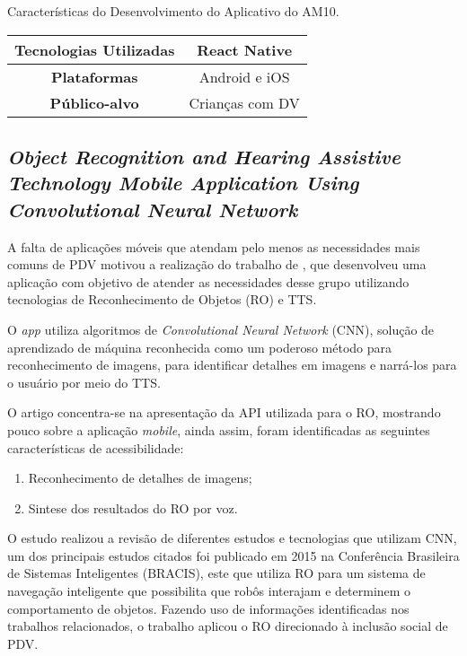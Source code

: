 \begin{quadro}[htb!]
  \caption{\label{qua-car-am10}Características do Desenvolvimento do Aplicativo do AM10.}
  \begin{tabular}{|c|c|}
    \hline
    \textbf{Tecnologias Utilizadas} & React Native    \\ \hline
    \textbf{Plataformas}            & Android e iOS   \\ \hline
    \textbf{Público-alvo}           & Crianças com DV \\
    \hline
  \end{tabular}
\end{quadro}

\subsection{\emph{Object Recognition and Hearing Assistive Technology Mobile Application Using Convolutional Neural Network}}

A falta de aplicações móveis que atendam pelo menos as necessidades mais comuns de PDV motivou a realização do trabalho de , que desenvolveu
uma aplicação com objetivo de atender as necessidades desse grupo utilizando tecnologias de Reconhecimento de Objetos (RO) e TTS\@.

O \emph{app} utiliza algoritmos de \emph{Convolutional Neural Network} (CNN), solução de aprendizado de máquina reconhecida como um poderoso método para reconhecimento de
imagens, para identificar detalhes em imagens e narrá\@-los para o usuário por meio do TTS\@.

O artigo concentra-se na apresentação da API utilizada para o RO, mostrando pouco sobre a aplicação \emph{mobile},
ainda assim, foram identificadas as seguintes características de acessibilidade:

\begin{enumerate}
  \item Reconhecimento de detalhes de imagens;
  \item Sintese dos resultados do RO por voz.
\end{enumerate}

O estudo realizou a revisão de diferentes estudos e tecnologias que utilizam CNN, um dos principais estudos citados
foi publicado em 2015 na Conferência Brasileira de Sistemas Inteligentes (BRACIS), este que utiliza RO para um sistema
de navegação inteligente que possibilita que robôs interajam e determinem o comportamento de objetos.
Fazendo uso de informações identificadas nos trabalhos relacionados, o trabalho aplicou o RO direcionado à inclusão social de PDV\@.

